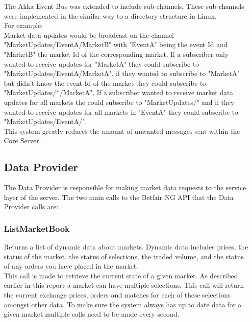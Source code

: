 		The Akka Event Bus was extended to include sub-channels. These sub-channels were implemented in the similar way to a directory structure in Linux.\\ 
		
		For example:\\  
		
		Market data updates would be broadcast on the channel "MarketUpdates/EventA/MarketB" with "EventA" being the event Id and "MarketB" the market Id of the corresponding market. If a subscriber only wanted to receive updates for "MarketA" they could subscribe to "MarketUpdates/EventA/MarketA", if they wanted to subscribe to "MarketA" but didn't know the event Id of the market they could subscribe to "MarketUpdates/*/MarketA". If a subscriber wanted to receive market data updates for all markets the could subscribe to "MarketUpdates/" and if they wanted to receive updates for all markets in "EventA" they could subscribe to "MarketUpdates/EventA/".\\
			
		This system greatly reduces the amount of unwanted messages sent within the Core Server.
					
	\subsection{Data Provider}
		The Data Provider is responsible for making market data requests to the service layer of the server. The two main calls to the Betfair NG API that the Data Provider calls are:

		\subsubsection{ListMarketBook} 
			Returns a list of dynamic data about markets. Dynamic data includes prices, the status of the market, the status of selections, the traded volume, and the status of any orders you have placed in the market\cite{ListMarketBook}.\\
			
			This call is made to retrieve the current state of a given market. As described earlier in this report a market can have multiple selections. This call will return the current exchange prices, orders and matches for each of these selections amongst other data. To make sure the system always has up to date data for a given market multiple calls need to be made every second.\\
			
